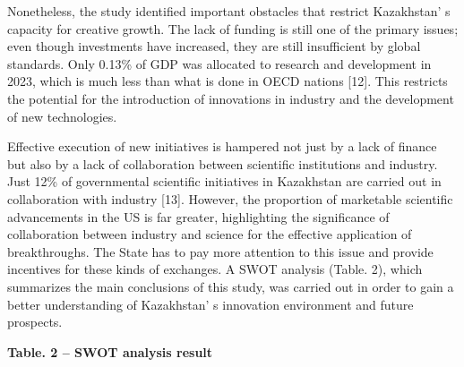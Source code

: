 Nonetheless, the study identified important obstacles that restrict
Kazakhstan' s capacity for creative growth. The lack of
funding is still one of the primary issues; even though investments have
increased, they are still insufficient by global standards. Only 0.13\%
of GDP was allocated to research and development in 2023, which is much
less than what is done in OECD nations {[}12{]}. This restricts the
potential for the introduction of innovations in industry and the
development of new technologies.

Effective execution of new initiatives is hampered not just by a lack of
finance but also by a lack of collaboration between scientific
institutions and industry. Just 12\% of governmental scientific
initiatives in Kazakhstan are carried out in collaboration with industry
{[}13{]}. However, the proportion of marketable scientific advancements
in the US is far greater, highlighting the significance of collaboration
between industry and science for the effective application of
breakthroughs. The State has to pay more attention to this issue and
provide incentives for these kinds of exchanges. A SWOT analysis (Table.
2), which summarizes the main conclusions of this study, was carried out
in order to gain a better understanding of Kazakhstan' s
innovation environment and future prospects.

{\bfseries Table. 2 -- SWOT analysis result}


